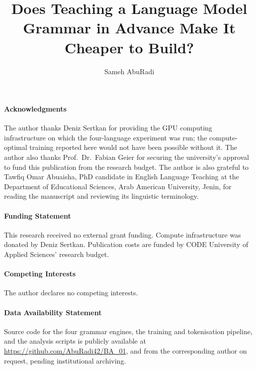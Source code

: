 \documentclass[
  journal=nlp,
  manuscript=article-type,
  year=2026,
  volume=1,
]{cup-journal}
\title{Does Teaching a Language Model Grammar in Advance Make It Cheaper to Build?}
\author{Sameh AbuRadi}
\affiliation{CODE University of Applied Sciences, Berlin\\Supervised by Prof.\ Dr.\ Fabian Geier}
\begin{document}










\begingroup
\footnotesize

\paragraph{Acknowledgments}
The author thanks Deniz Sertkan for providing the GPU computing infrastructure on which the four-language experiment was run; the compute-optimal training reported here would not have been possible without it. The author also thanks Prof.\ Dr.\ Fabian Geier for securing the university's approval to fund this publication from the research budget. The author is also grateful to Tawfiq Omar Abuaisha, PhD candidate in English Language Teaching at the Department of Educational Sciences, Arab American University, Jenin, for reading the manuscript and reviewing its linguistic terminology.

\paragraph{Funding Statement}
This research received no external grant funding. Compute infrastructure was donated by Deniz Sertkan. Publication costs are funded by CODE University of Applied Sciences' research budget.

\paragraph{Competing Interests}
The author declares no competing interests.

\paragraph{Data Availability Statement}
Source code for the four grammar engines, the training and tokenisation pipeline, and the analysis scripts is publicly available at \url{https://github.com/AbuRadi42/BA_01}, and from the corresponding author on request, pending institutional archiving.
\end{document}
